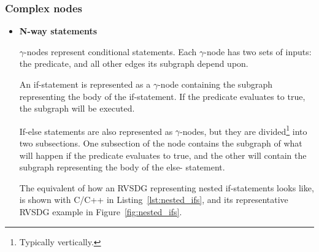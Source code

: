 \subsubsection{Complex nodes}

\begin{itemize}

\item \textbf{N-way statements}

\textit{$\gamma$}-nodes represent conditional statements. Each $\gamma$-node has
two sets of inputs: the predicate, and all other edges its subgraph depend upon.

An if-statement is represented as a $\gamma$-node containing the subgraph
representing the body of the if-statement. If the predicate evaluates to true,
the subgraph will be executed.

If-else statements are also represented as $\gamma$-nodes, but they are
divided\footnote{Typically vertically.} into two subsections. One subsection of
the node contains the subgraph of what will happen if the predicate evaluates to
true, and the other will contain the subgraph representing the body of the else-
statement.

The equivalent of how an RVSDG representing nested if-statements looks like, is
shown with C/C++ in Listing~\ref{lst:nested_ifs}, and its representative RVSDG
example in Figure~\ref{fig:nested_ifs}.


\end{itemize}
